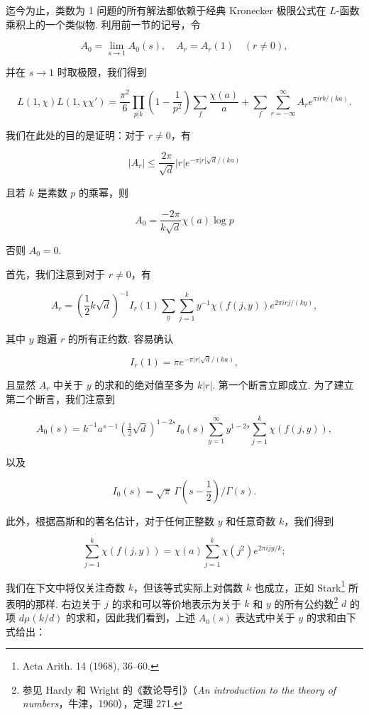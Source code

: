 迄今为止，类数为 1 问题的所有解法都依赖于经典 Kronecker 极限公式在 $L$-函数 乘积上的一个类似物. 利用前一节的记号，令

\[A_0 = \lim_{s \to 1} A_0(s), \quad A_r = A_r(1) \quad (r \neq 0),\]

并在 $s \to 1$ 时取极限，我们得到

\begin{equation}\tag{2}\label{eq:ch5_eq2}
L(1,\chi)L(1,\chi\chi') = \frac{\pi^2}{6} \prod_{p|k} \left(1 - \frac{1}{p^2}\right) \sum_{f} \frac{\chi(a)}{a} + \sum_{f} \sum_{r=-\infty}^{\infty} A_r e^{\pi i r b/(ka)}.
\end{equation}

我们在此处的目的是证明：对于 $r \neq 0$，有

\[\left|A_r\right|\le \frac{2\pi}{\sqrt{d}}\left|r\right|e^{-\pi|r|\sqrt{d}/(ka)}\]

且若 $k$ 是素数 $p$ 的乘幂，则

\[A_0 = \frac{-2\pi}{k\sqrt{d}} \chi(a) \log p\]

否则 $A_0 = 0$.

首先，我们注意到对于 $r \neq 0$，有

\[A_r = (\frac{1}{2}k\sqrt{d})^{-1}I_r(1)\sum_{y}\sum_{j=1}^k y^{-1}\chi(f(j,y))e^{2\pi i r j/(ky)},\]

其中 $y$ 跑遍 $r$ 的所有正约数. 容易确认

\[ I_r(1) = \pi e^{-\pi |r| \sqrt{d}/(ka)}, \]

且显然 $A_r$ 中关于 $y$ 的求和的绝对值至多为 $k|r|$. 第一个断言立即成立. 为了建立第二个断言，我们注意到

\[A_0(s) = k^{-1}a^{s-1}(\tfrac{1}{2}\sqrt{d})^{1-2s}I_0(s)\sum_{y=1}^{\infty}y^{1-2s}\sum_{j=1}^k\chi(f(j,y)),\]

以及

\[I_0(s) = \sqrt{\pi} \, \Gamma(s - \frac{1}{2}) / \Gamma(s).\]

此外，根据高斯和的著名估计，对于任何正整数 $y$ 和任意奇数 $k$，我们得到

\[\sum_{j=1}^{k} \chi(f(j,y)) = \chi(a) \sum_{j=1}^{k} \chi(j^{2}) e^{2\pi i j y/k};\]

我们在下文中将仅关注奇数 $k$，但该等式实际上对偶数 $k$ 也成立，正如 Stark\footnote{Acta Arith. 14 (1968), 36--60.} 所表明的那样. 右边关于 $j$ 的求和可以等价地表示为关于 $k$ 和 $y$ 的所有公约数\footnote{参见 Hardy 和 Wright 的《数论导引》（\textit{An introduction to the theory of numbers}，牛津，1960），定理 271.} $d$ 的项 $d \mu(k/d)$ 的求和，因此我们看到，上述 $A_0(s)$ 表达式中关于 $y$ 的求和由下式给出：

